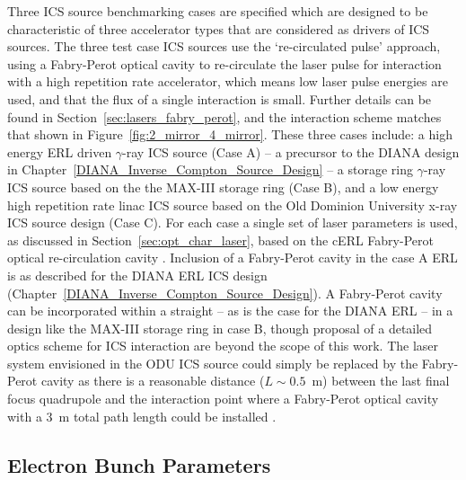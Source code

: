 \documentclass[../main.tex]{subfiles}
\begin{document}
Three ICS source benchmarking cases are specified which are designed to be characteristic of three accelerator types that are considered as drivers of ICS sources. The three test case ICS sources use the `re-circulated pulse' approach, using a Fabry-Perot optical cavity to re-circulate the laser pulse for interaction with a high repetition rate accelerator, which means low laser pulse energies are used, and that the flux of a single interaction is small. Further details can be found in Section~\ref{sec:lasers_fabry_perot}, and the interaction scheme matches that shown in Figure~\ref{fig:2_mirror_4_mirror}. These three cases include: a high energy ERL driven $\gamma$-ray ICS source (Case A) -- a precursor to the DIANA design in Chapter~\ref{DIANA_Inverse_Compton_Source_Design} -- a storage ring $\gamma$-ray ICS source based on the the MAX-III storage ring  \cite{owen2013nonequilibrium,sjostrom2009max} (Case B), and a low energy high repetition rate linac ICS source based on the Old Dominion University x-ray ICS source design \cite{krafft2016laser,deitrick2017inverse,deitrick2018high} (Case C). For each case a single set of laser parameters is used, as discussed in Section~\ref{sec:opt_char_laser}, based on the cERL Fabry-Perot optical re-circulation cavity \cite{akagi2016narrow}. Inclusion of a Fabry-Perot cavity in the case A ERL is as described for the DIANA ERL ICS design (Chapter~\ref{DIANA_Inverse_Compton_Source_Design}). A Fabry-Perot cavity can be incorporated within a straight -- as is the case for the DIANA ERL -- in a design like the MAX-III storage ring in case B, though proposal of a detailed optics scheme for ICS interaction are beyond the scope of this work. The laser system envisioned in the ODU ICS source \cite{krafft2016laser,deitrick2017inverse,deitrick2018high} could simply be replaced by the Fabry-Perot cavity as there is a reasonable distance ($L\sim0.5$~\si{\meter}) between the last final focus quadrupole and the interaction point where a Fabry-Perot optical cavity with a 3~\si{\meter} total path length could be installed \cite{deitrick2018high}.

\subsection{Electron Bunch Parameters}
\end{document}

